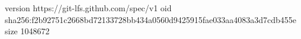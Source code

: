 version https://git-lfs.github.com/spec/v1
oid sha256:f2b92751c2668bd72133728bb434a0560d9425915fae033aa4083a3d7cdb455e
size 1048672
